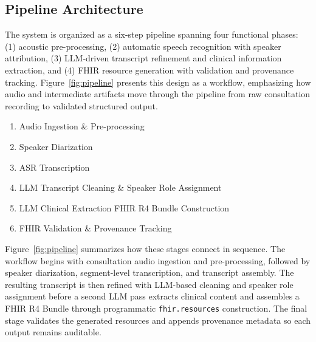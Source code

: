 \subsection{Pipeline Architecture}

The system is organized as a six-step pipeline spanning four functional phases: (1) acoustic pre-processing, (2) automatic speech recognition with speaker attribution, (3) LLM-driven transcript refinement and clinical information extraction, and (4) FHIR resource generation with validation and provenance tracking. Figure~\ref{fig:pipeline} presents this design as a workflow, emphasizing how audio and intermediate artifacts move through the pipeline from raw consultation recording to validated structured output.

\begin{enumerate}
  \item Audio Ingestion \& Pre-processing
  \item Speaker Diarization
  \item ASR Transcription
  \item LLM Transcript Cleaning \& Speaker Role Assignment
  \item LLM Clinical Extraction \textrightarrow{} FHIR R4 Bundle Construction
  \item FHIR Validation \& Provenance Tracking
\end{enumerate}

Figure~\ref{fig:pipeline} summarizes how these stages connect in sequence. The workflow begins with consultation audio ingestion and pre-processing, followed by speaker diarization, segment-level transcription, and transcript assembly. The resulting transcript is then refined with LLM-based cleaning and speaker role assignment before a second LLM pass extracts clinical content and assembles a FHIR R4 Bundle through programmatic \texttt{fhir.resources} construction. The final stage validates the generated resources and appends provenance metadata so each output remains auditable.

